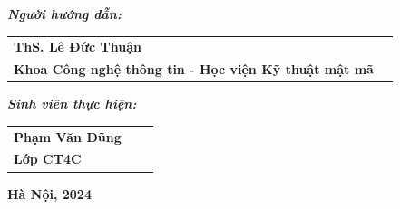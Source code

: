 \begin{titlepage}
\begin{flushleft}
		\hspace{3cm}\textbf{\textit{Người hướng dẫn:}}
		
		\begin{tabular}{l c}
			
			\hspace{4cm}\textbf{ThS. Lê Đức Thuận} \\
			
			\hspace{4cm}\textbf{Khoa Công nghệ thông tin - Học viện Kỹ thuật mật mã}
			
		\end{tabular}
		
		\vspace{0.6cm}
		
		\hspace{3cm}\textbf{\textit{Sinh viên thực hiện:}}
		
		\begin{tabular}{l c c}
			
			\hspace{4cm}\textbf{Phạm Văn Dũng} &  \\
			
			\hspace{4cm}\textbf{Lớp CT4C}
		\end{tabular}
		
	\end{flushleft}
	
	\begin{center}
		
		\vspace{1cm}
		
		\textbf{Hà Nội, 2024}
		
	\end{center}
\end{titlepage}
